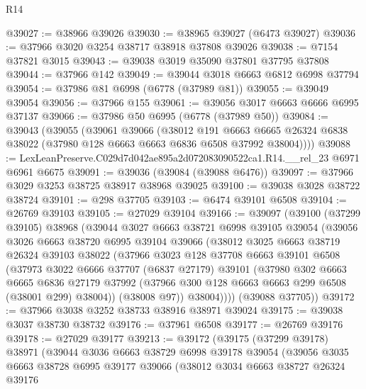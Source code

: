 \begin{lexlean}{R14}
\begin{coremodule}
@39027 := @38966 @39026
@39030 := @38965 @39027 (@6473 @39027)
@39036 := @37966 @3020 @3254 @38717 @38918 @37808 @39026
@39038 := @7154 @37821 @3015
@39043 := @39038 @3019 @35090 @37801 @37795 @37808
@39044 := @37966 @142
@39049 := @39044 @3018 @6663 @6812 @6998 @37794
@39054 := @37986 @81 @6998 (@6778 (@37989 @81))
@39055 := @39049 @39054
@39056 := @37966 @155
@39061 := @39056 @3017 @6663 @6666 @6995 @37137
@39066 := @37986 @50 @6995 (@6778 (@37989 @50))
@39084 := @39043
    (@39055
      (@39061
        @39066
        (@38012
          @191
          @6663
          @6665
          @26324
          @6838
          @38022
          (@37980 @128 @6663 @6663 @6836 @6508 @37992 @38004))))
@39088 := LexLeanPreserve.C029d7d042ae895a2d072083090522ca1.R14.__rel_23 @6971 @6961 @6675
@39091 := @39036 (@39084 (@39088 @6476))
@39097 := @37966 @3029 @3253 @38725 @38917 @38968 @39025
@39100 := @39038 @3028 @38722 @38724
@39101 := @298 @37705
@39103 := @6474 @39101 @6508
@39104 := @26769 @39103
@39105 := @27029 @39104
@39166 := @39097
    (@39100
      (@37299 @39105)
      @38968
      (@39044
        @3027
        @6663
        @38721
        @6998
        @39105
        @39054
        (@39056
          @3026
          @6663
          @38720
          @6995
          @39104
          @39066
          (@38012
            @3025
            @6663
            @38719
            @26324
            @39103
            @38022
            (@37966
              @3023
              @128
              @37708
              @6663
              @39101
              @6508
              (@37973
                @3022
                @6666
                @37707
                (@6837 @27179)
                @39101
                (@37980
                  @302
                  @6663
                  @6665
                  @6836
                  @27179
                  @37992
                  (@37966 @300 @128 @6663 @6663 @299 @6508 (@38001 @299) @38004))
                (@38008 @97))
              @38004))))
      (@39088 @37705))
@39172 := @37966 @3038 @3252 @38733 @38916 @38971 @39024
@39175 := @39038 @3037 @38730 @38732
@39176 := @37961 @6508
@39177 := @26769 @39176
@39178 := @27029 @39177
@39213 := @39172
    (@39175
      (@37299 @39178)
      @38971
      (@39044
        @3036
        @6663
        @38729
        @6998
        @39178
        @39054
        (@39056
          @3035
          @6663
          @38728
          @6995
          @39177
          @39066
          (@38012
            @3034
            @6663
            @38727
            @26324
            @39176

\end{coremodule}
\end{lexlean}
